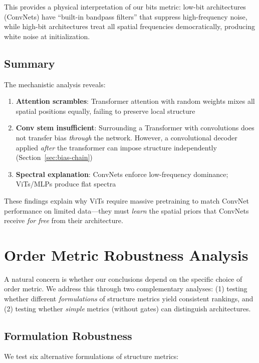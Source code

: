 This provides a physical interpretation of our bits metric: low-bit architectures (ConvNets) have ``built-in bandpass filters'' that suppress high-frequency noise, while high-bit architectures treat all spatial frequencies democratically, producing white noise at initialization.

\subsection{Summary}

The mechanistic analysis reveals:
\begin{enumerate}
    \item \textbf{Attention scrambles}: Transformer attention with random weights mixes all spatial positions equally, failing to preserve local structure
    \item \textbf{Conv stem insufficient}: Surrounding a Transformer with convolutions does not transfer bias \emph{through} the network. However, a convolutional decoder applied \emph{after} the transformer can impose structure independently (Section~\ref{sec:bias-chain})
    \item \textbf{Spectral explanation}: ConvNets enforce low-frequency dominance; ViTs/MLPs produce flat spectra
\end{enumerate}

These findings explain why ViTs require massive pretraining to match ConvNet performance on limited data---they must \emph{learn} the spatial priors that ConvNets receive \emph{for free} from their architecture.




\section{Order Metric Robustness Analysis}
\label{app:robustness}

A natural concern is whether our conclusions depend on the specific choice of order metric. We address this through two complementary analyses: (1) testing whether different \emph{formulations} of structure metrics yield consistent rankings, and (2) testing whether \emph{simple} metrics (without gates) can distinguish architectures.

\subsection{Formulation Robustness}

We test six alternative formulations of structure metrics:

